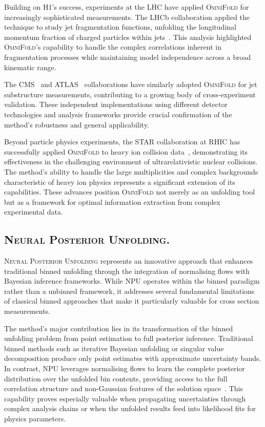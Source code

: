     Building on H1's success, experiments at the LHC have applied \textsc{OmniFold} for increasingly sophisticated measurements.
    The LHCb collaboration applied the technique to study jet fragmentation functions, unfolding the longitudinal momentum fraction of charged particles within jets~\cite{collaboration_multidifferential_2023}.
    This analysis highlighted \textsc{OmniFold}'s capability to handle the complex correlations inherent in fragmentation processes while maintaining model independence across a broad kinematic range.
    
    The CMS~\cite{CMS:2025sws} and ATLAS~\cite{collaboration_measurement_2025,collaboration_simultaneous_2024,Pan:2909063} collaborations have similarly adopted \textsc{OmniFold} for jet substructure measurements, contributing to a growing body of cross-experiment validation.
    These independent implementations using different detector technologies and analysis frameworks provide crucial confirmation of the method's robustness and general applicability.
    
    Beyond particle physics experiments, the STAR collaboration at RHIC has successfully applied \textsc{OmniFold} to heavy ion collision data~\cite{song_measurement_2023}, demonstrating its effectiveness in the challenging environment of ultrarelativistic nuclear collisions.
    The method's ability to handle the large multiplicities and complex backgrounds characteristic of heavy ion physics represents a significant extension of its capabilities.
    These advances position \textsc{OmniFold} not merely as an unfolding tool but as a framework for optimal information extraction from complex experimental data.

\subsection{\textsc{Neural Posterior Unfolding}.}
    \textsc{Neural Posterior Unfolding} represents an innovative approach that enhances traditional binned unfolding through the integration of normalising flows with Bayesian inference frameworks.
    While NPU operates within the binned paradigm rather than a unbinned framework, it addresses several fundamental limitations of classical binned approaches that make it particularly valuable for cross section measurements.

    The method's major contribution lies in its transformation of the binned unfolding problem from point estimation to full posterior inference.
    Traditional binned methods such as iterative Bayesian unfolding or singular value decomposition produce only point estimates with approximate uncertainty bands.
    In contrast, NPU leverages normalising flows to learn the complete posterior distribution over the unfolded bin contents, providing access to the full correlation structure and non-Gaussian features of the solution space~\cite{acosta2024npu}.
    This capability proves especially valuable when propagating uncertainties through complex analysis chains or when the unfolded results feed into likelihood fits for physics parameters.

